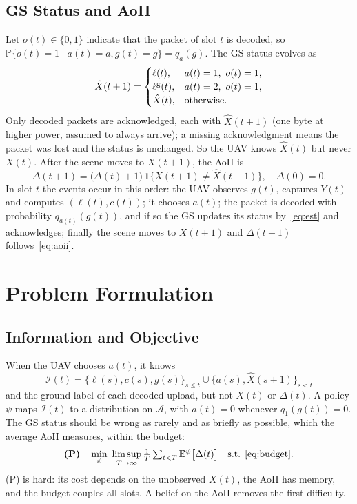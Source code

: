 \documentclass[conference]{IEEEtran}
\theoremstyle{remark}
\newcommand{\E}{\mathbb{E}}
\newcommand{\Prob}{\mathbb{P}}
\newcommand{\ind}[1]{\mathbf{1}\{#1\}}
\newcommand{\A}{\mathcal{A}}
\newcommand{\I}{\mathcal{I}}
\newcommand{\lab}{\ell}
\begin{document}
\subsection{GS Status and AoII}
Let $o(t)\in\{0,1\}$ indicate that the packet of slot $t$ is decoded, so $\Prob\{o(t)=1\mid a(t)=a,g(t)=g\}=q_a(g)$. The GS status evolves as
\begin{equation}\label{eq:est}
\hat X(t+1)=\begin{cases}\lab(t), & a(t)=1,\ o(t)=1,\\ \lab^{\rm g}(t), & a(t)=2,\ o(t)=1,\\ \hat X(t), & \text{otherwise.}\end{cases}
\end{equation}
Only decoded packets are acknowledged, each with $\hat X(t+1)$ (one byte at higher power, assumed to always arrive); a missing acknowledgment means the packet was lost and the status is unchanged. So the UAV knows $\hat X(t)$ but never $X(t)$. After the scene moves to $X(t+1)$, the AoII is
\begin{equation}\label{eq:aoii}
\Delta(t+1)=\big(\Delta(t)+1\big)\,\ind{X(t+1)\neq\hat X(t+1)},\quad \Delta(0)=0.
\end{equation}
In slot $t$ the events occur in this order: the UAV observes $g(t)$, captures $Y(t)$ and computes $(\lab(t),c(t))$; it chooses $a(t)$; the packet is decoded with probability $q_{a(t)}(g(t))$, and if so the GS updates its status by~\eqref{eq:est} and acknowledges; finally the scene moves to $X(t+1)$ and $\Delta(t+1)$ follows~\eqref{eq:aoii}.

\section{Problem Formulation}\label{sec:problem}
\subsection{Information and Objective}
When the UAV chooses $a(t)$, it knows
\begin{equation}\label{eq:info}
\I(t)=\big\{\lab(s),c(s),g(s)\big\}_{s\le t}\cup\big\{a(s),\hat X(s+1)\big\}_{s<t}
\end{equation}
and the ground label of each decoded upload, but not $X(t)$ or $\Delta(t)$. A policy $\psi$ maps $\I(t)$ to a distribution on $\A$, with $a(t)=0$ whenever $q_1(g(t))=0$. The GS status should be wrong as rarely and as briefly as possible, which the average AoII measures, within the budget:
\begin{equation}\label{eq:P}
\textbf{(P)}\quad \min_{\psi}\ \limsup_{T\to\infty}\tfrac1T\textstyle\sum_{t<T}\E^{\psi}\big[\Delta(t)\big]\quad\text{s.t. \eqref{eq:budget}}.
\end{equation}
(P) is hard: its cost depends on the unobserved $X(t)$, the AoII has memory, and the budget couples all slots. A belief on the AoII removes the first difficulty.
\end{document}
